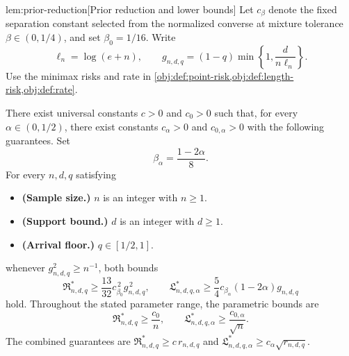 \documentclass[11pt]{article}
\begin{document}
\begin{lemmav}{lem:prior-reduction}[Prior reduction and lower bounds]
Let \(c_\beta\) denote the fixed separation constant selected from the normalized converse at mixture tolerance \(\beta\in(0,1/4)\), and set \(\beta_0=1/16\). Write
\[
\ell_n=\log(e+n),
\qquad
g_{n,d,q}=(1-q)\min\left\{1,\frac{d}{n\ell_n}\right\}.
\]
Use the minimax risks and rate in \cref{obj:def:point-risk,obj:def:length-risk,obj:def:rate}.

There exist universal constants \(c>0\) and \(c_0>0\) such that, for every \(\alpha\in(0,1/2)\), there exist constants \(c_\alpha>0\) and \(c_{0,\alpha}>0\) with the following guarantees. Set
\[
\beta_\alpha=\frac{1-2\alpha}{8}.
\]
For every \(n,d,q\) satisfying
\begin{itemize}
\item \textbf{(Sample size.)} \(n\) is an integer with \(n\ge1\).
\item \textbf{(Support bound.)} \(d\) is an integer with \(d\ge1\).
\item \textbf{(Arrival floor.)} \(q\in[1/2,1]\).
\end{itemize}
whenever \(g_{n,d,q}^2\ge n^{-1}\), both bounds
\[
\mathfrak R^*_{n,d,q}
\ge \frac{13}{32}c_{\beta_0}^{\,2}g_{n,d,q}^{\,2},
\qquad
\mathfrak L^*_{n,d,q,\alpha}
\ge \frac54 c_{\beta_\alpha}(1-2\alpha)g_{n,d,q}
\]
hold. Throughout the stated parameter range, the parametric bounds are
\[
\mathfrak R^*_{n,d,q}\ge\frac{c_0}{n},
\qquad
\mathfrak L^*_{n,d,q,\alpha}\ge\frac{c_{0,\alpha}}{\sqrt n}.
\]
The combined guarantees are
\(\mathfrak R^*_{n,d,q}\ge c\,r_{n,d,q}\) and
\(\mathfrak L^*_{n,d,q,\alpha}\ge c_\alpha\sqrt{r_{n,d,q}}\).
\end{lemmav}
\end{document}
